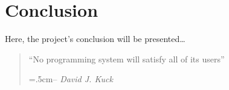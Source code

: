 \chapter{Conclusion}

Here, the project's conclusion will be presented\ldots

\begin{quote}
``No programming system will satisfy all of its users''

\leftskip=.5cm-- \textit{David J. Kuck}~\cite{kuck1992user}
\end{quote}

\nlipsum
